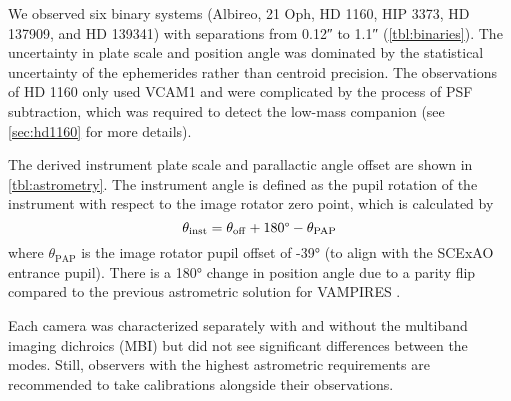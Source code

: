 We observed six binary systems (Albireo, 21 Oph, HD 1160, HIP 3373, HD 137909, and HD 139341) with separations from \ang{;;0.12} to \ang{;;1.1} (\autoref{tbl:binaries}). The uncertainty in plate scale and position angle was dominated by the statistical uncertainty of the ephemerides rather than centroid precision. The observations of HD 1160 only used VCAM1 and were complicated by the process of PSF subtraction, which was required to detect the low-mass companion (see \autoref{sec:hd1160} for more details).

The derived instrument plate scale and parallactic angle offset are shown in \autoref{tbl:astrometry}. The instrument angle is defined as the pupil rotation of the instrument with respect to the image rotator zero point, which is calculated by
\begin{equation}
    \theta_\mathrm{inst} = \theta_\mathrm{off} + 180\text{\textdegree} - \theta_\mathrm{PAP}
\end{equation}
where $\theta_\mathrm{PAP}$ is the image rotator pupil offset of \ang{-39} (to align with the SCExAO entrance pupil). There is a \ang{180} change in position angle due to a parity flip compared to the previous astrometric solution for VAMPIRES \citep{currie_images_2022}.

Each camera was characterized separately with and without the multiband imaging dichroics (MBI) but did not see significant differences between the modes. Still, observers with the highest astrometric requirements are recommended to take calibrations alongside their observations.

